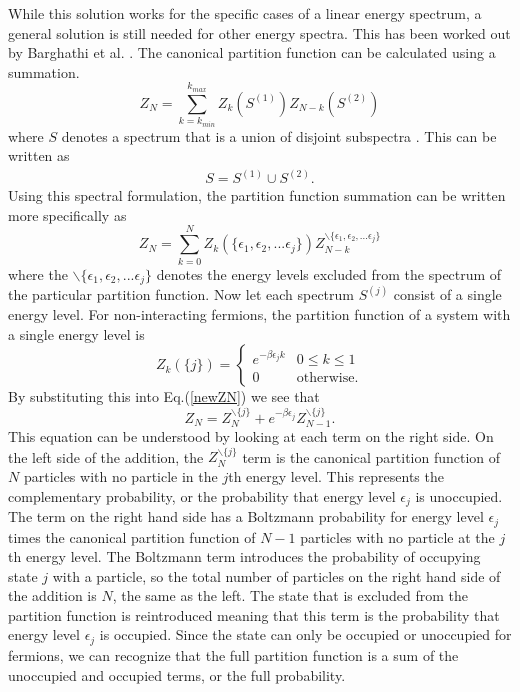 While this solution works for the specific cases of a linear energy spectrum, a general solution is still needed for other energy spectra. This has been worked out by Barghathi et al. \cite{Hatem2020}. The canonical partition function can be calculated using a summation.
\begin{equation}
    Z_N=\sum_{k=k_{min}}^{k_{max}} Z_k(S^{(1)})Z_{N-k}(S^{(2)})
    \label{eq:ZNcombine}
\end{equation}
where $S$ denotes a spectrum that is a union of disjoint subspectra \cite{Hatem2020}. This can be written as 
\begin{gather}
    S=S^{(1)}\cup S^{(2)}.
\end{gather}
Using this spectral formulation, the partition function summation can be written more specifically as 
\begin{equation}
    Z_N=\sum_{k=0}^N Z_k(\{\epsilon_1,\epsilon_2,...\epsilon_j\})Z_{N-k}^{\backslash \{\epsilon_1,\epsilon_2,...\epsilon_j\}} \label{newZN}
\end{equation}
where the $\backslash \{\epsilon_1,\epsilon_2,...\epsilon_j\} $ denotes the energy levels excluded from the spectrum of the particular partition function. Now let each spectrum $S^{(j)}$ consist of a single energy level. For non-interacting fermions, the partition function of a system with a single energy level is
\begin{equation}
    Z_k(\{j\})=\begin{cases} e^{-\beta \epsilon_j k} & 0\leq k \leq 1\\0 & \text{otherwise}.\end{cases}
\end{equation}
By substituting this into Eq.\@ (\ref{newZN}) we see that
\begin{equation}
    Z_N=Z_N^{\backslash\{j\}}+e^{-\beta\epsilon_j}Z_{N-1}^{\backslash\{j\}}. \label{hatemrr}
\end{equation}
This equation can be understood by looking at each term on the right side. On the left side of the addition, the $Z_N^{\backslash\{j\}}$ term is the canonical partition function of $N$ particles with no particle in the $j$th energy level. This represents the complementary probability, or the probability that energy level $\epsilon_j$ is unoccupied. The term on the right hand side has a Boltzmann probability for energy level $\epsilon_j$ times the canonical partition function of $N-1$ particles with no particle at the $j$th energy level. The Boltzmann term introduces the probability of occupying state $j$ with a particle, so the total number of particles on the right hand side of the addition is $N$, the same as the left. The state that is excluded from the partition function is reintroduced meaning that this term is the probability that energy level $\epsilon_j$ is occupied. Since the state can only be occupied or unoccupied for fermions, we can recognize that the full partition function is a sum of the unoccupied and occupied terms, or the full probability. 

